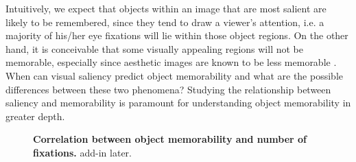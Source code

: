 Intuitively, we expect that objects within an image that are most salient are likely to be remembered, since they tend to draw a viewer's attention, i.e. a majority of his/her eye fixations will lie within those object regions. On the other hand, it is conceivable that some visually appealing regions will not be memorable, especially since aesthetic images are known to be less memorable \cite{isola11,isola14}. When can visual saliency predict object memorability and what are the possible differences between these two phenomena? Studying the relationship between saliency and memorability is paramount for understanding object memorability in greater depth.

\begin{figure}[!htb]
\centering
{}
\vspace{-5mm}\caption{\footnotesize\textbf{Correlation between object memorability and number of fixations.} add-in later. }\label{fig:scatterFixation}
\end{figure}


